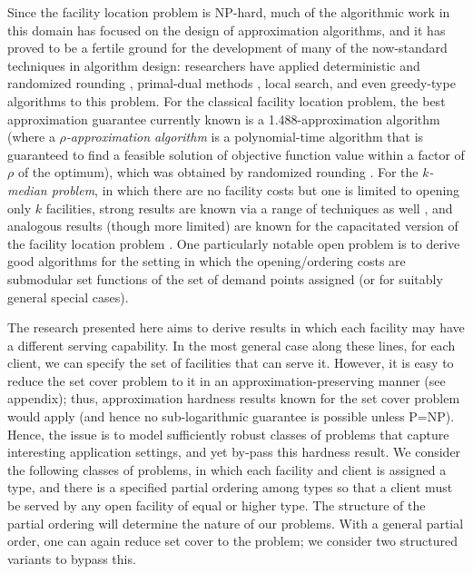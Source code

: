 Since the facility location problem is NP-hard, much of the algorithmic work in this domain has focused on the design of approximation algorithms, and it has proved to be a fertile ground for the development of many of the now-standard techniques in algorithm design:
researchers have applied deterministic and randomized rounding \cite{shmoys1997approximation,li20131,chudak2003improved}, primal-dual methods \cite{jain2001approximation}, local search\cite{korupolu2000analysis}, and even greedy-type algorithms \cite{jain2003greedy} to this problem. For the classical facility location problem, the best approximation guarantee currently known is a 1.488-approximation algorithm (where a {\it $\rho$-approximation algorithm} is a polynomial-time algorithm that is guaranteed to find a feasible solution of objective function value within a factor of $\rho$ of the optimum), which was obtained by randomized rounding \cite{li20131}.
For the {\it $k$-median problem}, in which there are no facility costs but one is limited to opening only $k$ facilities, strong results are known via a range of techniques as well \cite{li2013approximating,jain2001approximation,arya2004local}, and analogous results (though more limited) are known for the capacitated version of the facility location problem \cite{chudak2005improved,an2014lp,pal2001facility,bansal20125}. One particularly notable open problem is to derive good algorithms for the setting in which the opening/ordering costs are submodular set functions of the set of demand points assigned (or for suitably general special cases).

The research presented here aims to derive results in which each facility may have a
different serving capability. In the most general case along these lines, for each client,
we can specify the set of facilities that can serve it. However, it is easy to reduce the
set cover problem to it in an approximation-preserving manner (see appendix); thus, approximation
hardness results known for the set cover problem would apply (and hence no sub-logarithmic
guarantee is possible unless P=NP). Hence, the issue is to model sufficiently robust
classes of problems that capture interesting application settings, and yet by-pass this
hardness result.  We consider the following classes of problems, in which  each facility
and client is assigned a type, and there is a specified partial ordering among types so
that a client must be served by any open facility of equal or higher type.  
The structure of the partial ordering will determine the nature of our problems. 
With a general partial order, one can again reduce set cover to the problem; we consider
two structured variants to bypass this. 

